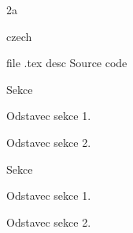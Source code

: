 \fontfam[lm]

\gswlang

\load[minim-mp]

\pdfalevel 2a

\setdocumentlanguage czech

\embedfile file {\jobname.tex} desc {Source code}

\sec Sekce


Odstavec sekce 1.

Odstavec sekce 2.


\nohyphlang

\sec Sekce


Odstavec sekce 1.

Odstavec sekce 2.


\bye
